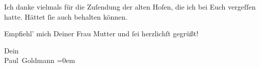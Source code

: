 \pstart
           Ich danke vielmals für die Zuſendung der alten Hoſen, die ich bei Euch vergeſſen
               hatte. Hättet{ }ſie auch behalten können.\pend
           
\pstart
           Empfiehl’ mich Deiner Frau Mutter und{ }ſei herzlichſt gegrüßt!\pend
           
\pstart
           Dein {\\[\baselineskip]}\spacefill\mbox{Paul Goldmann}\pend
           \leftskip=0em{}\endnumbering{}  \newcommand{\dateiname}{L03084}\newcommand{\titel}{Paul Goldmann an Arthur Schnitzler, 16. 9. [1901]}\newcommand{\editorInnen}{Martin Anton Müller und Laura Untner}

